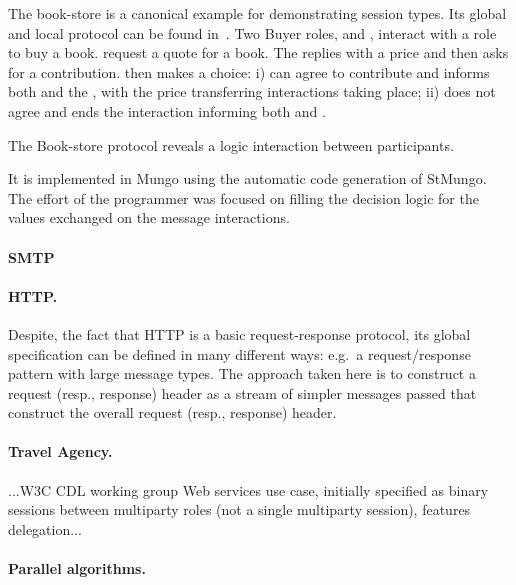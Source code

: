The book-store is a canonical example for demonstrating 
session types. Its global and \BuyerOne local protocol
can be found in~. Two
Buyer roles, \BuyerOne and \BuyerTwo, interact with a \Seller
role to buy a book. \BuyerOne request a quote for a book.
The \Seller replies with a price and then \BuyerOne asks
\BuyerTwo for a contribution. \BuyerTwo then makes a choice:
i) \BuyerTwo can agree to contribute and informs both \BuyerOne
and the \Seller, with the price transferring interactions taking
place; ii) \BuyerTwo does not agree and ends the interaction
informing both \BuyerOne and \Seller.

The Book-store protocol reveals a logic interaction between participants.

It is implemented in Mungo using the automatic code generation of
StMungo. The effort of the programmer was focused on filling the
decision logic for the values exchanged on the message interactions.


\paragraph{SMTP}


\paragraph{HTTP.}

Despite, the fact that HTTP is a basic request-response protocol,
its global specification can be defined in many different ways:
e.g.~a request/response pattern with large message types. The approach
taken here is to construct a request (resp., response) header as
a stream of simpler messages passed that construct the overall
request (resp., response) header. 

\paragraph{Travel Agency.}



...W3C CDL working group Web services use case, initially specified as binary sessions between multiparty roles (not a single multiparty session), features delegation...


\paragraph{Parallel algorithms.}


